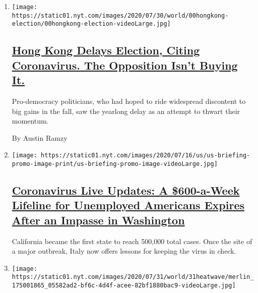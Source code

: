 \begin{enumerate}
\def\labelenumi{\arabic{enumi}.}
\item
  \texttt{[image: https://static01.nyt.com/images/2020/07/30/world/00hongkong-election/00hongkong-election-videoLarge.jpg]}

  \hypertarget{hong-kong-delays-election-citing-coronavirus-the-opposition-isnt-buying-it}{%
  \subsection{\texorpdfstring{\href{/2020/07/31/world/asia/hong-kong-election-delayed.html}{Hong
  Kong Delays Election, Citing Coronavirus. The Opposition Isn't Buying
  It.}}{Hong Kong Delays Election, Citing Coronavirus. The Opposition Isn't Buying It.}}\label{hong-kong-delays-election-citing-coronavirus-the-opposition-isnt-buying-it}}

  Pro-democracy politicians, who had hoped to ride widespread discontent
  to big gains in the fall, saw the yearlong delay as an attempt to
  thwart their momentum.

  By Austin Ramzy
\item
  \texttt{[image: https://static01.nyt.com/images/2020/07/16/us/us-briefing-promo-image-print/us-briefing-promo-image-videoLarge.jpg]}

  \hypertarget{coronavirus-live-updates-a-600-a-week-lifeline-for-unemployed-americans-expires-after-an-impasse-in-washington}{%
  \subsection{\texorpdfstring{\href{/2020/07/31/world/coronavirus-covid-19.html}{Coronavirus
  Live Updates: A \$600-a-Week Lifeline for Unemployed Americans Expires
  After an Impasse in
  Washington}}{Coronavirus Live Updates: A \$600-a-Week Lifeline for Unemployed Americans Expires After an Impasse in Washington}}\label{coronavirus-live-updates-a-600-a-week-lifeline-for-unemployed-americans-expires-after-an-impasse-in-washington}}

  California became the first state to reach 500,000 total cases. Once
  the site of a major outbreak, Italy now offers lessons for keeping the
  virus in check.
\item
  \texttt{[image: https://static01.nyt.com/images/2020/07/31/world/31heatwave/merlin\_175001865\_05582ad2-bf6c-4d4f-acee-82bf1880bac9-videoLarge.jpg]}

  \hypertarget{scorching-temperatures-bake-middle-east-amid-eid-al-adha-celebrations}{%
}
\end{enumerate}
